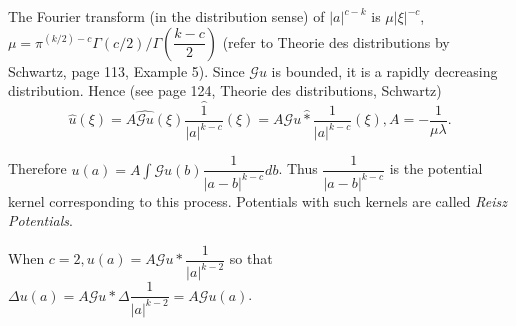 The Fourier transform (in the distribution sense) of $|a|^{c-k}$ is
$\mu | \xi |^{-c}$, $\mu = \pi^{(k/2)-c} \Gamma (c/2) / \Gamma
(\dfrac{k-c}{2})$ (refer to Theorie des distributions by Sch\-wartz,
page 113, Example 5). Since $\mathscr{G} u$ is bounded, it is a
rapidly decreasing distribution. Hence (see page 124, Theorie des
distributions, Schwartz) 
$$
\hat{u}(\xi) = A \widehat{\mathscr{G} u} (\xi)
\frac{\hat{1}}{|a|^{k-c}} (\xi) = A \mathscr{G} u \hat{*}
\frac{1}{|a|^{k-c}}(\xi), A = - \frac{1}{\mu \lambda}. 
$$

Therefore $u(a) = A \int \mathscr{G} u (b)  \dfrac{1}{|a-b|^{k-c}}
db$. Thus  $\dfrac{1}{|a-b|^{k-c}}$ is the potential kernel
corresponding to this process. Potentials with such kernels are called
\textit{Reisz Potentials}. 

When $c= 2, u (a) = A \mathscr{G} u *  \dfrac{1}{|a|^{k-2}}$ so that
$\Delta u (a) = A \mathscr{G} u * \Delta  \dfrac{1}{|a|^{k-2}} = A
\mathscr{G} u (a)$. 
